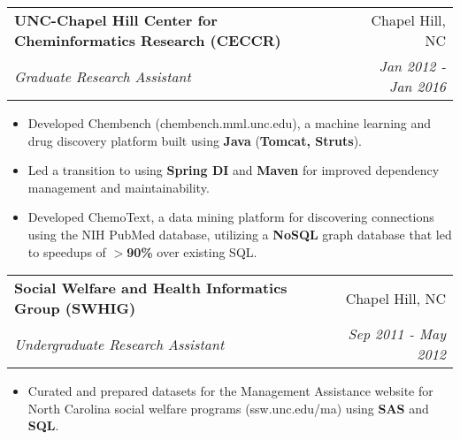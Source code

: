 \documentclass[letterpaper,11pt]{article}
\makeatletter
\newcommand{\resumeItem}[2]{
  \item\small{
    \textbf{#1}{#2 \vspace{-2pt}}
  }
}
\newcommand{\resumeSubheading}[4]{
  \vspace{-1pt}\item
    \begin{tabular*}{0.97\textwidth}[t]{l@{\extracolsep{\fill}}r}
      \textbf{#1} & #2 \\
      \textit{\small#3} & \textit{\small #4} \\
    \end{tabular*}\vspace{-5pt}
}
\newcommand{\resumeItemListStart}{\begin{itemize}}
\newcommand{\resumeItemListEnd}{\end{itemize}\vspace{-5pt}}
\makeatother
\begin{document}




    \resumeSubheading
      {UNC-Chapel Hill Center for Cheminformatics Research (CECCR)}{Chapel Hill, NC}
      {Graduate Research Assistant}{Jan 2012 - Jan 2016}
      \resumeItemListStart
        \resumeItem{}
        {Developed Chembench (chembench.mml.unc.edu), a machine learning and drug discovery platform built using \textbf{Java} (\textbf{Tomcat, Struts}).}
        \resumeItem{}
        {Led a transition to using \textbf{Spring DI} and \textbf{Maven} for improved dependency management and maintainability.}
        \resumeItem{}
        {Developed ChemoText, a data mining platform for discovering connections using the NIH PubMed database, utilizing a \textbf{NoSQL} graph database that led to speedups of \textbf{$>$90\%} over existing SQL.}
      \resumeItemListEnd

    \resumeSubheading
      {Social Welfare and Health Informatics Group (SWHIG)}{Chapel Hill, NC}
      {Undergraduate Research Assistant}{Sep 2011 - May 2012}
      \resumeItemListStart
        \resumeItem{}
        {Curated and prepared datasets for the Management Assistance website for North Carolina social welfare programs (ssw.unc.edu/ma) using \textbf{SAS} and \textbf{SQL}.}
      \resumeItemListEnd
\end{document}
